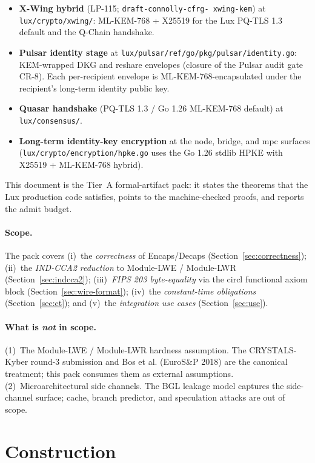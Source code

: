 \documentclass[11pt,a4paper]{article}
\begin{document}
\begin{itemize}
\item \textbf{X-Wing hybrid} (LP-115; \texttt{draft-connolly-cfrg-
  xwing-kem}) at \texttt{lux/crypto/xwing/}: ML-KEM-768 + X25519
  for the Lux PQ-TLS 1.3 default and the Q-Chain handshake.
\item \textbf{Pulsar identity stage} at
  \texttt{lux/pulsar/ref/go/pkg/pulsar/identity.go}:
  KEM-wrapped DKG and reshare envelopes (closure of the Pulsar
  audit gate CR-8). Each per-recipient envelope is
  ML-KEM-768-encapsulated under the recipient's long-term
  identity public key.
\item \textbf{Quasar handshake} (PQ-TLS 1.3 / Go 1.26 ML-KEM-768
  default) at \texttt{lux/consensus/}.
\item \textbf{Long-term identity-key encryption} at the node,
  bridge, and mpc surfaces (\texttt{lux/crypto/encryption/hpke.go}
  uses the Go 1.26 stdlib HPKE with X25519 + ML-KEM-768 hybrid).
\end{itemize}

This document is the Tier~A formal-artifact pack: it states the
theorems that the Lux production code satisfies, points to the
machine-checked proofs, and reports the admit budget.

\paragraph{Scope.}

The pack covers (i)~the \emph{correctness} of Encaps/Decaps
(Section~\ref{sec:correctness}); (ii)~the \emph{IND-CCA2 reduction}
to Module-LWE / Module-LWR (Section~\ref{sec:indcca2});
(iii)~\emph{FIPS 203 byte-equality} via the circl functional axiom
block (Section~\ref{sec:wire-format}); (iv)~the
\emph{constant-time obligations} (Section~\ref{sec:ct}); and
(v)~the \emph{integration use cases} (Section~\ref{sec:use}).

\paragraph{What is \emph{not} in scope.} (1)~The Module-LWE /
Module-LWR hardness assumption. The CRYSTALS-Kyber round-3
submission and Bos et al. (EuroS\&P 2018) are the canonical
treatment; this pack consumes them as external assumptions.
(2)~Microarchitectural side channels. The BGL leakage model
captures the side-channel surface; cache, branch predictor, and
speculation attacks are out of scope.

\section{Construction}\label{sec:construction}
\end{document}
